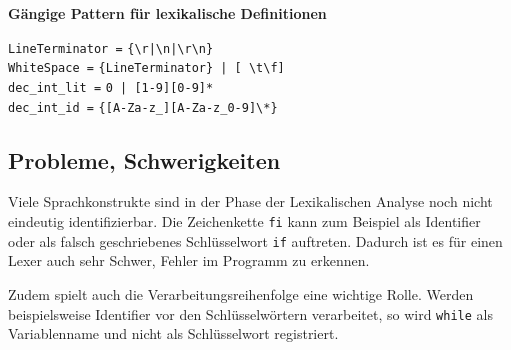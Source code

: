 \textbf{Gängige Pattern für lexikalische Definitionen}

\texttt{LineTerminator =} \verb/{\r|\n|\r\n}/ \\
\texttt{WhiteSpace =} \verb/{LineTerminator} | [ \t\f]/ \\
\texttt{dec\_int\_lit =} \verb/0 | [1-9][0-9]*/ \\
\texttt{dec\_int\_id =} \verb/{[A-Za-z_][A-Za-z_0-9]\*}/ \\


\subsection{Probleme, Schwerigkeiten}

Viele Sprachkonstrukte sind in der Phase der Lexikalischen Analyse noch nicht
eindeutig identifizierbar. Die Zeichenkette \texttt{fi} kann zum Beispiel als
Identifier oder als falsch geschriebenes Schlüsselwort \texttt{if} auftreten.
Dadurch ist es für einen Lexer auch sehr Schwer, Fehler im Programm zu erkennen.

Zudem spielt auch die Verarbeitungsreihenfolge eine wichtige Rolle. Werden
beispielsweise Identifier vor den Schlüsselwörtern verarbeitet, so wird
\texttt{while} als Variablenname und nicht als Schlüsselwort registriert.
